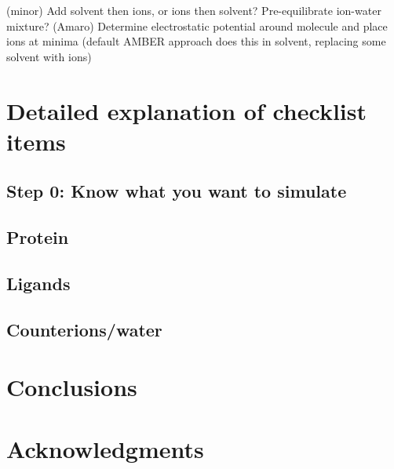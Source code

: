 \documentclass[9pt]{livecoms}
\begin{document}
(minor) Add solvent then ions, or ions then solvent? Pre-equilibrate ion-water mixture? (Amaro)
Determine electrostatic potential around molecule and place ions at minima (default AMBER approach does this in solvent, replacing some solvent with ions)



\section{Detailed explanation of checklist items}

\subsection{ Step 0: Know what you want to simulate }
\subsection{Protein}



\subsection{Ligands}



\subsection{Counterions/water}


\section{Conclusions}


\section{Acknowledgments}




\end{document}
